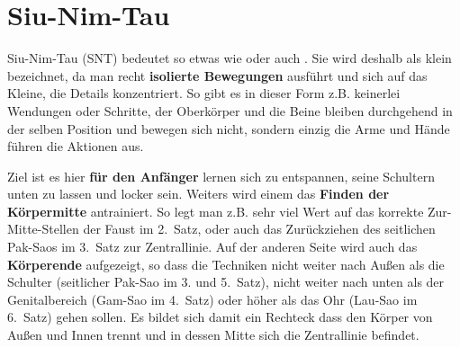 %
%
%
		

\section{Siu-Nim-Tau}




Siu-Nim-Tau (SNT) bedeutet so etwas wie  oder auch . Sie wird deshalb als klein bezeichnet, da man recht \textbf{isolierte Bewegungen} ausf\"uhrt und sich auf das Kleine, die Details konzentriert. So gibt es in dieser Form z.B. keinerlei Wendungen oder Schritte, der Oberk\"orper und die Beine bleiben durchgehend in der selben Position und bewegen sich nicht, sondern einzig die Arme und H\"ande f\"uhren die Aktionen aus.

Ziel ist es hier \textbf{f\"ur den Anf\"anger} lernen sich zu entspannen, seine Schultern unten zu lassen und locker sein. Weiters wird einem das \textbf{Finden der K\"orpermitte} antrainiert. So legt man z.B. sehr viel Wert auf das korrekte Zur-Mitte-Stellen der Faust im 2.~Satz, oder auch das Zur\"uckziehen des seitlichen Pak-Saos im 3.~Satz zur Zentrallinie. Auf der anderen Seite wird auch das \textbf{K\"orperende} aufgezeigt, so dass die Techniken nicht weiter nach Au{\ss}en als die Schulter (seitlicher Pak-Sao im 3. und 5.~Satz), nicht weiter nach unten als der Genitalbereich (Gam-Sao im 4.~Satz) oder h\"oher als das Ohr (Lau-Sao im 6.~Satz) gehen sollen. Es bildet sich damit ein Rechteck dass den K\"orper von Au{\ss}en und Innen trennt und in dessen Mitte sich die Zentrallinie befindet.



